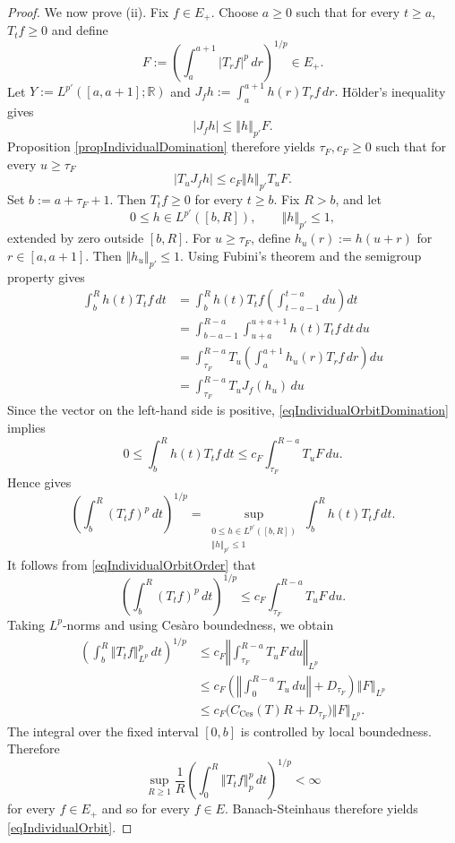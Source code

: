\documentclass[12pt]{amsart}
\theoremstyle{plain}
\theoremstyle{remark}
\theoremstyle{definition}
\newcommand{\R}{\mathbb{R}}
\newcommand{\norm}[1]{\left\Vert #1\right\Vert}
\begin{document}
\begin{proof}
		We now prove (ii). Fix $f\in E_+$. Choose $a\ge0$ such that for every $t\ge a$, $ T_tf\ge0$ and 
		define \[ F := \left( \int_a^{a+1}|T_rf|^p\,dr \right)^{1/p} \in E_+. \] Let $ Y:=L^{p'}([a,a+1];\R)$
		and $ J_fh:=\int_a^{a+1}h(r)T_rf\,dr. $  H\"older's inequality gives \[ |J_fh| \le \norm{h}_{p'}F. \] Proposition \ref{propIndividualDomination} therefore 
		yields $\tau_F,c_F\ge0$ such that for every $u \ge \tau_F$
		\begin{equation}\label{eqIndividualOrbitDomination} 
			|T_uJ_fh| \le c_F\norm{h}_{p'}T_uF. 
		\end{equation} 
		Set $ b:=a+\tau_F+1. $ Then $T_tf\ge0$ for every $t\ge b$. Fix $R>b$, and let \[ 0\le h\in L^{p'}([b,R]), \qquad \norm{h}_{p'}\le1, \] extended by zero outside $[b,R]$. For $u\ge\tau_F$, define $h_u(r):=h(u+r)$ for $r\in[a,a+1].$  Then $\norm{h_u}_{p'}\le1$. Using Fubini's theorem and the semigroup property gives \begin{align*}
			\int_b^R h(t) T_t f \, dt &= \int_b^R h(t) T_t f \left( \int_{t-a-1}^{t-a} du \right) dt \\
			&= \int_{b-a-1}^{R-a} \int_{u+a}^{u+a+1} h(t) T_t f \, dt \, du \\
			&= \int_{\tau_F}^{R-a} T_u \left( \int_a^{a+1} h_u(r) T_r f \, dr \right) du \\
			&= \int_{\tau_F}^{R-a} T_u J_f(h_u) \, du
		\end{align*}
		Since the vector on the left-hand side is positive, \eqref{eqIndividualOrbitDomination} implies \begin{equation}\label{eqIndividualOrbitOrder} 0 \le \int_b^R h(t)T_tf\,dt \le c_F\int_{\tau_F}^{R-a}T_uF\,du. \end{equation} 
		Hence \cite[Lemma 1]{Vogt2022} gives \[ \left( \int_b^R(T_tf)^p\,dt \right)^{1/p} = \sup_{\substack{ 0\le h\in L^{p'}([b,R])\\ \norm{h}_{p'}\le1 }} \int_b^R h(t)T_tf\,dt. \]
		It follows from \eqref{eqIndividualOrbitOrder} that 
		\[ \left( \int_b^R(T_tf)^p\,dt \right)^{1/p} \le c_F\int_{\tau_F}^{R-a}T_uF\,du. \]
		Taking $L^p$-norms and using Ces\`aro boundedness, we obtain 
		\begin{align*} \left( \int_b^R\norm{T_tf}_{L^p}^p\,dt \right)^{1/p} &\le c_F\norm{\int_{\tau_F}^{R-a}T_uF\,du}_{L^p}\\ &\le c_F\left( \norm{\int_0^{R-a}T_u\,du} + D_{\tau_F} \right)\norm{F}_{L^p}\\ &\le c_F\bigl(C_{\mathrm{Ces}}(T)R+D_{\tau_F}\bigr) \norm{F}_{L^p}. \end{align*}
		The integral over the fixed interval $[0,b]$ is controlled by local boundedness. Therefore \[ \sup_{R\ge1} \frac1R \left( \int_0^R\norm{T_tf}_p^p\,dt \right)^{1/p} <\infty \] 
		for every $f\in E_+$ and so for every $f \in E$. 
		Banach-Steinhaus therefore yields \eqref{eqIndividualOrbit}. \end{proof} 
	
\end{document}
